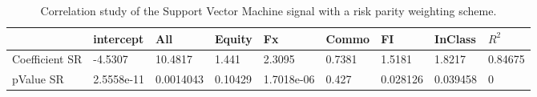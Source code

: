 \begin{table}[H]
\centering
\begin{tabular}{lllllllll}
\hline& intercept & All & Equity & Fx & Commo & FI & InClass & $R^{2}$ \\ 
\hline 
Coefficient SR & -4.5307 & 10.4817 & 1.441 & 2.3095 & 0.7381 & 1.5181 & 1.8217 & 0.84675 \\ 
pValue SR & 2.5558e-11 & 0.0014043 & 0.10429 & 1.7018e-06 & 0.427 & 0.028126 & 0.039458 & 0 \\ 
\hline
\end{tabular}
\caption{Correlation study of the Support Vector Machine signal with a risk parity weighting scheme.}
\label{SVM_RP_CORR}
\end{table}